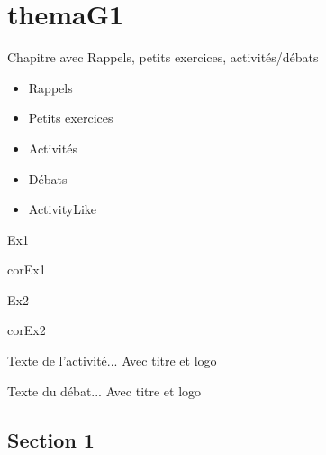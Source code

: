 \documentclass[nocrop]{sesamanuel}
\begin{document}
\themaG

\chapter{themaG1}
\begin{prerequis}[Prérequis - G1]
  Chapitre avec Rappels, petits exercices, activités/débats
  \begin{itemize}
  \item Rappels
  \item Petits exercices
  \item Activités
  \item Débats
  \item ActivityLike
  \end{itemize}
\end{prerequis}

\begin{autoeval}  
    \begin{exercice}
      Ex1
    \end{exercice}
    \begin{corrige}
      corEx1
    \end{corrige}
    \begin{exercice}
      Ex2
    \end{exercice}
    \begin{corrige}
      corEx2
    \end{corrige}
\end{autoeval}

\activites
\begin{activite}
  Texte de l’activité... Avec titre et logo
\end{activite}
\begin{debat}
  Texte du débat... Avec titre et logo
\end{debat}

\cours
\section{Section 1}
\end{document}
